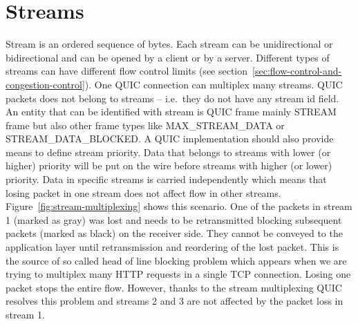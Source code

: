 \section{Streams}
\label{sec:streams}
Stream is an ordered sequence of bytes.
Each stream can be unidirectional or bidirectional and can be opened by a client or by a server.
Different types of streams can have different flow control limits (see section~\ref{sec:flow-control-and-congestion-control}).
One QUIC connection can multiplex many streams.
QUIC packets does not belong to streams -- i.e.\ they do not have any stream id field.
An entity that can be identified with stream is QUIC frame mainly STREAM frame but also other frame types like MAX\_STREAM\_DATA or STREAM\_DATA\_BLOCKED\@.
A QUIC implementation should also provide means to define stream priority.
Data that belongs to streams with lower (or higher) priority will be put on the wire before streams with higher (or lower)
priority.
Data in specific streams is carried independently which means that losing packet in one stream does not affect flow in other streams.
Figure~\ref{fig:stream-multiplexing} shows this scenario.
One of the packets in stream 1 (marked as gray) was lost and needs to be retransmitted blocking subsequent packets (marked as black) on the receiver side.
They cannot be conveyed to the application layer until retransmission and reordering of the lost packet.
This is the source of so called head of line blocking problem which appears when we are trying to multiplex many HTTP requests in a single TCP connection.
Losing one packet stops the entire flow.
However, thanks to the stream multiplexing QUIC resolves this problem and streams 2 and 3 are not affected by the packet loss in stream 1.

